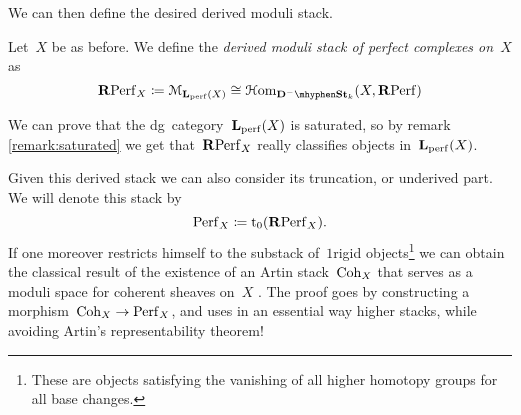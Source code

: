 \begin{refsection}
We can then define the desired derived moduli stack.
\begin{definition}
  Let~$X$ be as before. We define the \emph{derived moduli stack of perfect complexes on~$X$} as
  \begin{equation}
    \RPerf_X\coloneqq\mathcal{M}_{\LLL_\perf(X)}\cong\HHom_{\mathbf{D}^-\mhyphen\St_k}(X,\RPerf)
  \end{equation}
\end{definition}

\begin{remark}
  We can prove that the dg~category~$\mathbf{L}_{\mathrm{perf}}(X)$ is saturated, so by remark \ref{remark:saturated} we get that~$\mathbf{R}\mathrm{Perf}_X$ really classifies objects in~$\mathbf{L}_{\mathrm{perf}}(X)$.
\end{remark}

\begin{remark}
  Given this derived stack we can also consider its truncation, or underived part. We will denote this stack by
  \begin{equation}
    \mathrm{Perf}_X\coloneqq\mathrm{t}_0(\mathbf{R}\mathrm{Perf}_X).
  \end{equation}
  If one moreover restricts himself to the substack of~$1$\dash rigid objects\footnote{These are objects satisfying the vanishing of all higher homotopy groups for all base changes.} we can obtain the classical result of the existence of an Artin stack~$\mathrm{Coh}_X$ that serves as a moduli space for coherent sheaves on~$X$ \cite[th\'eor\`eme 4.6.2.1]{laumon-moret-bailly} \cite[tag 08KA]{stacks}. The proof goes by constructing a morphism~$\mathrm{Coh}_X\to\mathrm{Perf}_X$, and uses in an essential way higher stacks, while avoiding Artin's representability theorem!
\end{remark}



\printbibliography[heading = local]

\end{refsection}
